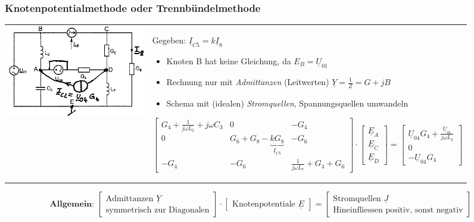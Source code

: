 \subsubsection{Knotenpotentialmethode oder Trennbündelmethode}
\begin{tabular}{ll}
\parbox{6cm}{\includegraphics[width=6cm]{./images/netzwerkanalyse-knotenpotential.png}
	}
	& \parbox{12cm}{
	Gegeben: $\underline{I}_{C5} = k \underline{I}_8$
	\begin{itemize}
      \item Knoten B hat keine Gleichung, da $E_B = \underline{U}_{01}$
      \item Rechnung nur mit \textit{Admittanzen} (Leitwerten) $\underline{Y}
      = \frac{1}{\underline{Z}} = G + jB$
      \item Schema mit (idealen) \textit{Stromquellen}, Spannungsquellen
      umwandeln
    \end{itemize}
$$\begin{bmatrix}
    G_4 + \frac{1}{j \omega L_2} + j \omega C_3 & 0 & -G_4 \\
    0 & G_6 + G_8 - \underbrace{k G_8}_{\underline{I}_{C5}} & -G_6 \\
    -G_4 & -G_6 & \frac{1}{j \omega L_7} + G_4 + G_6   
	\end{bmatrix} \cdot
\begin{bmatrix}
    \underline{E}_A \\ \underline{E}_C \\ \underline{E}_D
    \end{bmatrix} =
\begin{bmatrix}
    \underline{U}_{04} G_4 + \frac{\underline{U}_{01} }{j \omega L_2}\\ 
    0 \\
    -\underline{U}_{04} G_4 \end{bmatrix}$$    
	}
\end{tabular}

$$\textbf{Allgemein: }\left[ \begin{array}{cc}
       \text{Admittanzen $\underline{Y}$} \\
       \text{symmetrisch zur Diagonalen}
       \end{array}\right] \cdot \left[ \begin{array}{cc}
     \text{Knotenpotentiale $\underline{E}$}
     \end{array}\right] =
\left[ \begin{array}{cc}
     \text{Stromquellen $\underline{J}$} \\
    \text{Hineinfliessen positiv, sonst negativ}
     \end{array}\right]$$

